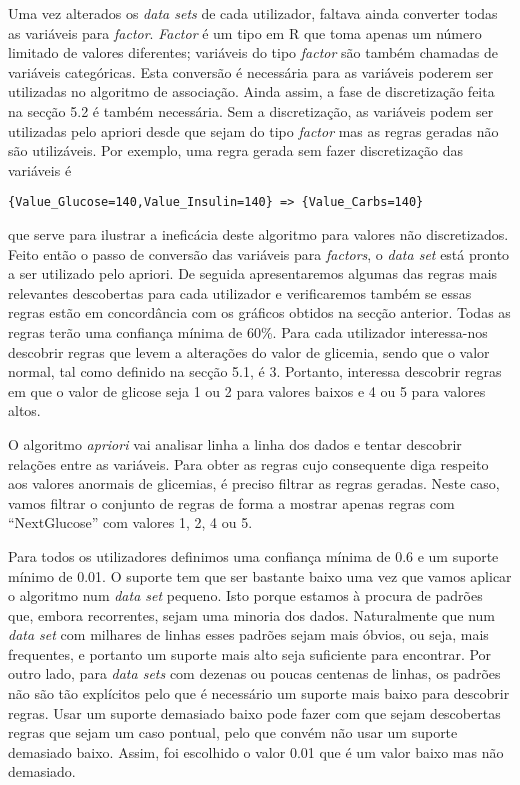 Uma vez alterados os \textit{data sets} de cada utilizador, faltava ainda converter todas as variáveis para \textit{factor}. \textit{Factor} é um tipo em R que toma apenas um número limitado de valores diferentes; variáveis do tipo \textit{factor} são também chamadas de variáveis categóricas. Esta conversão é necessária para as variáveis poderem ser utilizadas no algoritmo de associação. Ainda assim, a fase de discretização feita na secção 5.2 é também necessária. Sem a discretização, as variáveis podem ser utilizadas pelo apriori desde que sejam do tipo \textit{factor} mas as regras geradas não são utilizáveis. Por exemplo, uma regra gerada sem fazer discretização das variáveis é

\begin{lstlisting}
{Value_Glucose=140,Value_Insulin=140} => {Value_Carbs=140}
\end{lstlisting}

que serve para ilustrar a ineficácia deste algoritmo para valores não discretizados. Feito então o passo de conversão das variáveis para \textit{factors}, o \textit{data set} está pronto a ser utilizado pelo apriori. De seguida apresentaremos algumas das regras mais relevantes descobertas para cada utilizador e verificaremos também se essas regras estão em concordância com os gráficos obtidos na secção anterior. Todas as regras terão uma confiança mínima de 60\%.
Para cada utilizador interessa-nos descobrir regras que levem a alterações do valor de glicemia, sendo que o valor normal, tal como definido na secção 5.1, é 3. Portanto, interessa descobrir regras em que o valor de glicose seja 1 ou 2 para valores baixos e 4 ou 5 para valores altos.

O algoritmo \textit{apriori} vai analisar linha a linha dos dados e tentar descobrir relações entre as variáveis. Para obter as regras cujo consequente diga respeito aos valores anormais de glicemias, é preciso filtrar as regras geradas. Neste caso, vamos filtrar o conjunto de regras de forma a mostrar apenas regras com ``Next\textunderscore Glucose'' com valores 1, 2, 4 ou 5. 

Para todos os utilizadores definimos uma confiança mínima de 0.6 e um suporte mínimo de 0.01. O suporte tem que ser bastante baixo uma vez que vamos aplicar o algoritmo num \textit{data set} pequeno. Isto porque estamos à procura de padrões que, embora recorrentes, sejam uma minoria dos dados. Naturalmente que num \textit{data set} com milhares de linhas esses padrões sejam mais óbvios, ou seja, mais frequentes, e portanto um suporte mais alto seja suficiente para encontrar. Por outro lado, para \textit{data sets} com dezenas ou poucas centenas de linhas, os padrões não são tão explícitos pelo que é necessário um suporte mais baixo para descobrir regras. Usar um suporte demasiado baixo pode fazer com que sejam descobertas regras que sejam um caso pontual, pelo que convém não usar um suporte demasiado baixo. Assim, foi escolhido o valor 0.01 que é um valor baixo mas não demasiado. 

